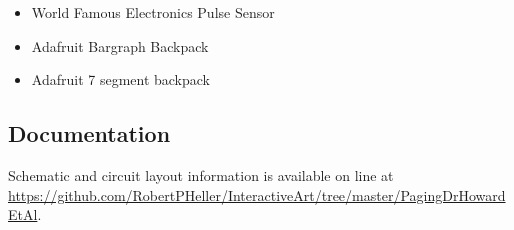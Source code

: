 \begin{itemize}
\item World Famous Electronics Pulse Sensor
\item Adafruit Bargraph Backpack
\item Adafruit 7 segment backpack
\end{itemize}

\subsection*{Documentation}

Schematic and circuit layout information is available on line at 
\url{https://github.com/RobertPHeller/InteractiveArt/tree/master/PagingDrHowardEtAl}.
